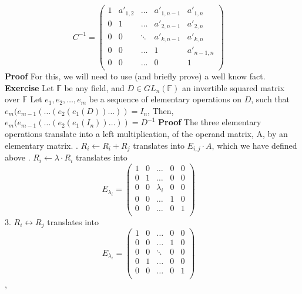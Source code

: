 \documentclass[12pt]{article}
\begin{document}
 $$
C^{-1}=\begin{pmatrix} 
	1 & a'_{1,2} & \dots & a'_{1,n-1} & a'_{1,n} \\
	0 & 1 & \dots & a'_{2,n-1} & a'_{2,n} \\
	0 & 0 & \ddots & a'_{k,n-1} & a'_{k,n} \\
	0 & 0 & \dots & 1 & a'_{n-1,n} \\
	0 & 0 & \dots & 0 & 1 \\
	\end{pmatrix}
	\quad
 $$
\textbf{Proof} \newline
For this, we will need to use (and briefly prove) a well know fact. \newline
\textbf{Exercise} \newline
Let $\mathbb{F}$ be any field, and $D \in GL_n(\mathbb{F})$ an invertible squared matrix over $\mathbb{F}$ \newline
Let $e_1,e_2,\dots,e_m$ be a sequence of elementary operations on $D$, such that $e_m(e_{m-1}(\dots(e_2(e_1(D))\dots))=I_n$, Then, \newline
$e_m(e_{m-1}(\dots(e_2(e_1(I_n))\dots))=D^{-1}$ \newline
\textbf{Proof} \newline
The three elementary operations translate into a left multiplication, of the operand matrix, A, by an elementary matrix. . $R_i \leftarrow R_i+R_j$ translates into $E_{i,j} \cdot A$, which we have defined above . $R_i \leftarrow \lambda \cdot R_i$ translates into $$
E_{\lambda_i}=\begin{pmatrix} 
	1 & 0 & \dots & 0 & 0 \\
	0 & 1 & \dots & 0 & 0 \\
	0 & 0 & \lambda_i & 0 & 0 \\
	0 & 0 & \dots & 1 & 0 \\
	0 & 0 & \dots & 0 & 1 \\
	\end{pmatrix}
	\quad
$$
3. $R_i \leftrightarrow R_j$ translates into $$
E_{\lambda_i}=\begin{pmatrix} 
	1 & 0 & \dots & 0 & 0 \\
	0 & 0 & \dots & 1 & 0 \\
	0 & 0 & \ddots & 0 & 0 \\
	0 & 1 & \dots & 0 & 0 \\
	0 & 0 & \dots & 0 & 1 \\
	\end{pmatrix}
	\quad
$$, 
\end{document}
